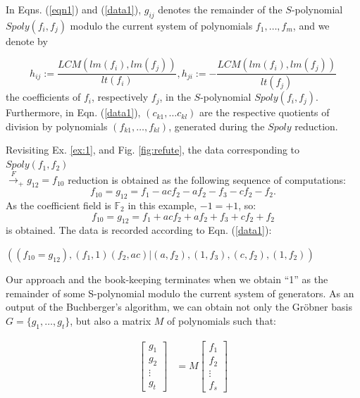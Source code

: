 In Eqns. (\ref{eqn1}) and (\ref{data1}), $g_{ij}$ denotes the
remainder of the $S$-polynomial $Spoly(f_i,f_j)$ modulo the current system
of polynomials $f_1,\ldots,f_m$, and we denote by  

$$h_{ij}:=\displaystyle\frac{LCM(lm(f_i),lm(f_j))}{lt(f_i)},
h_{ji}:= - \displaystyle\frac{LCM(lm(f_i),lm(f_j))}{lt(f_j)}$$ 
the coefficients of $f_i$, respectively $f_j$, in the $S$-polynomial
$Spoly(f_i,f_j)$. Furthermore, in Eqn. (\ref{data1}), $(c_{k1}, \dots
c_{kl})$ are the respective quotients of division by
polynomials $(f_{k1},\dots,f_{kl})$, generated during the $Spoly$ reduction.  

\begin{Example}
Revisiting Ex. \ref{ex:1}, and Fig. \ref{fig:refute}, the data
corresponding to $Spoly(f_1,f_2)$\\$\xrightarrow{F}_+  g_{12} = f_{10}$
reduction is obtained as the following sequence of computations:
$$f_{10}=g_{12}=f_1-acf_2-af_2-f_3-cf_2-f_2.$$ As the coefficient
field is $\mathbb{F}_2$ in this example, $-1 = +1$, so:
$$f_{10}=g_{12}=f_1+acf_2+af_2+f_3+cf_2+f_2$$ is obtained.
The data is recorded according to Eqn. (\ref{data1}):

\begin{center}
$((f_{10}=g_{12}), (f_1,1)(f_2,ac)|(a,f_2),(1,f_3),(c,f_2),(1,f_2))$
\end{center}

\end{Example}

Our approach and the book-keeping terminates when we obtain ``1'' as the
remainder of some S-polynomial modulo the current system of 
generators. As an output of the Buchberger's algorithm, we can obtain
not only the Gr\"obner basis $G = \{g_1,\ldots,g_t\}$, but also a
matrix $M$ of polynomials such that: 

\vspace{-0.1in}
\begin{center}
\begin{align}
   \begin{bmatrix}
           g_{1} \\
           g_{2} \\
           \vdots \\
           g_{t}
         \end{bmatrix}
    &= M \begin{bmatrix}
           f_{1} \\
           f_{2} \\
           \vdots \\
           f_{s}
         \end{bmatrix}
  \end{align}

\end{center}

